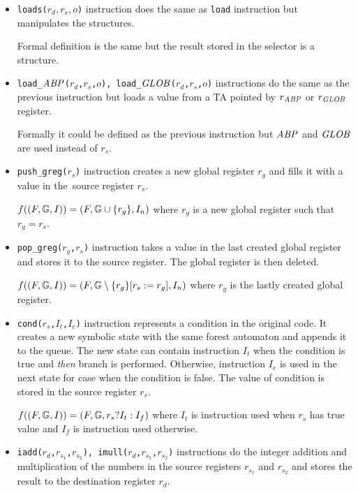 \begin{itemize}
		\item {\tt loads($r_d,r_s,o$)} instruction does the same as {\tt load} instruction but manipulates the structures.
		
		Formal definition is the same but the result stored in the selector is a structure.

	\item {\tt load\_$\abp$($r_d$,$r_s$,$o$), load\_$\glb$($r_d$,$r_s$,$o$)} instructions do the same as
		the previous instruction but loads a value from a TA pointed by $r_{\abp}$ or $r_{\glb}$ register.
		
		Formally it could be defined as the previous instruction but
		$\abp$ and $\glb$ are used instead of $r_s$.

	\item {\tt push\_greg($r_s$)} instruction creates a new global register $r_g$
		and fills it with a value in the~source register $r_s$.
		
		$f(\stdsym) = \symstate{F}
		{\regs\cup \{r_g\}}
		{I_n}$
		where $r_g$ is a new global register such that $r_g = r_s$.
	
	\item {\tt pop\_greg($r_g$,$r_s$)} instruction takes a value in the last created
		global register and stores it to the source register.
		The global register is then deleted.
		
		$f(\stdsym) = \symstate{F}
		{\regssubmin{r_s}{r_g}{r_g}}
		{I_n}$
		where $r_g$ is the lastly created global register.

	\item {\tt cond($r_s$,$I_t$,$I_e$)} instruction represents a condition in the original code.
		It creates a new symbolic state with the same forest automaton and appends
		it to the queue.
		The new state can contain instruction $I_t$ when the condition is true
		and \emph{then} branch is performed.
		Otherwise, instruction $I_e$ is used in the next state for case when
		the condition is false.
		The value of condition is stored in the source register $r_s$.

		$f(\stdsym) = \symstate{F}{\regs}{r_s ? I_t : I_f}$
		where $I_t$ is instruction used when $r_s$ has true value and
		$I_f$ is instruction used otherwise.


	\item {\tt iadd($r_d$,$r_{s_1}$,$r_{s_2}$), imull($r_d$,$r_{s_1}$,$r_{s_2}$)}
		instructions do the integer addition and multiplication of the numbers
		in the source registers $r_{s_1}$ and $r_{s_2}$ and stores the result to
		the destination register $r_d$.
		

\end{itemize}
